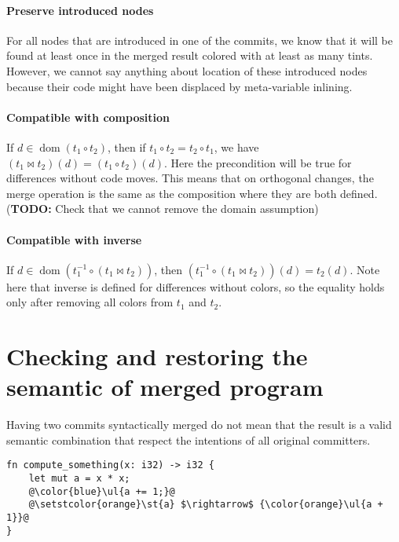 \documentclass[a4paper,11pt]{article}
\newcommand\merge{\mathbin{\Join}}
\DeclareMathOperator\dom{dom}
\newcommand\todo[1]{{\color{teal}(\textbf{TODO:} #1)}}
\begin{document}
\paragraph{Preserve introduced nodes}
For all nodes that are introduced in one of the commits, we know that
it will be found at least once in the merged result colored with at
least as many tints. However, we cannot say anything about location of
these introduced nodes because their code might have been displaced by
meta-variable inlining.

\paragraph{Compatible with composition}
If $d \in \dom(t_1 \circ t_2)$, then if $t_1 \circ t_2 = t_2 \circ
t_1$, we have $(t_1 \merge t_2)(d) = (t_1 \circ t_2)(d)$. Here the
precondition will be true for differences without code moves. This
means that on orthogonal changes, the merge operation is the same as
the composition where they are both defined. \todo{Check that we
  cannot remove the domain assumption}

\paragraph{Compatible with inverse}
If $d \in \dom(t_1^{-1} \circ (t_1 \merge t_2))$, then $(t_1^{-1}
\circ (t_1 \merge t_2))(d) = t_2(d)$. Note here that inverse is
defined for differences without colors, so the equality holds only
after removing all colors from $t_1$ and $t_2$.

\section{Checking and restoring the semantic of merged program}
\label{sec:semantic-merge}

Having two commits syntactically merged do not mean that the result is a valid semantic combination that respect the intentions of all original committers.

\begin{lstlisting}[label=lst:double-incr, caption={Double fix of the same function by different commits. The syntactic fusion does not create a conflict be semantically we can create a new bug here.}]
fn compute_something(x: i32) -> i32 {
    let mut a = x * x;
    @\color{blue}\ul{a += 1;}@
    @\setstcolor{orange}\st{a} $\rightarrow$ {\color{orange}\ul{a + 1}}@
}
\end{lstlisting}
\end{document}

